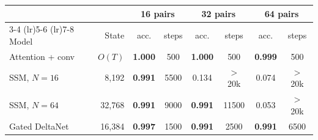 \begin{tabular}{lrcccccc}
\toprule
 & & \multicolumn{2}{c}{16 pairs} & \multicolumn{2}{c}{32 pairs} & \multicolumn{2}{c}{64 pairs} \\
\cmidrule(lr){3-4} \cmidrule(lr){5-6} \cmidrule(lr){7-8}
Model & State & acc. & steps & acc. & steps & acc. & steps \\
\midrule
Attention + conv & $O(T)$ & \textbf{1.000} & 500 & \textbf{1.000} & 500 & \textbf{0.999} & 500 \\
SSM, $N{=}16$ & 8,192 & \textbf{0.991} & 5500 & 0.134 & $>$20k & 0.074 & $>$20k \\
SSM, $N{=}64$ & 32,768 & \textbf{0.991} & 9000 & \textbf{0.991} & 11500 & 0.053 & $>$20k \\
Gated DeltaNet & 16,384 & \textbf{0.997} & 1500 & \textbf{0.991} & 2500 & \textbf{0.991} & 6500 \\
\bottomrule
\end{tabular}
